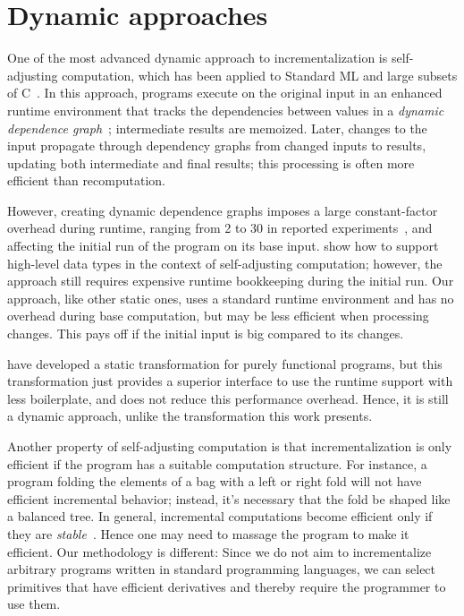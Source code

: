 \section{Dynamic approaches}
One of the most advanced dynamic approach to incrementalization is
self-adjusting computation, which has been applied to Standard ML
and large subsets of C~\citep{Acar09,Hammer11}.
In this approach, programs execute on the original
input in an enhanced runtime environment that tracks the
dependencies between values in a \emph{dynamic
  dependence graph}~\citep{Acar06}; intermediate results are
memoized.
Later, changes to the input propagate through
dependency graphs from changed inputs to results,
updating both intermediate and final results;
this processing is often more efficient than recomputation.

However, creating dynamic
dependence graphs imposes a large constant-factor overhead during
runtime, ranging from 2 to 30 in reported
experiments~\citep{Acar09EAS,Acar10TDT}, and affecting the
initial run of the program on its base input.
\citet{Acar10TDT} show how to support high-level data
types in the context of self-adjusting computation; however, the
approach still requires expensive runtime bookkeeping during the initial run.
Our approach, like other static ones, uses a standard runtime
environment and has no overhead
during base computation, but may be less efficient when processing
changes. This pays off if the initial input is
big compared to its changes.


\citet{Chen11} have developed a static transformation for purely
functional programs, but this transformation just provides a superior interface to use
the runtime support with less boilerplate, and does not reduce
this performance overhead. Hence, it is still a dynamic approach, unlike
the transformation this work presents.

Another property of self-adjusting computation
is that incrementalization is only efficient if the program has a suitable
computation structure. For instance, a program
folding the elements of a bag with a left or right fold will not
have efficient incremental behavior; instead, it's necessary that
the fold be shaped like a balanced tree. In general,
incremental computations become efficient only if they are \emph{stable}~\citep{Acar05}.
Hence one may need to massage the program to make it efficient. Our methodology is
different: Since we do not aim to incrementalize arbitrary programs written in standard
programming languages, we can select primitives that have efficient derivatives and thereby require
the programmer to use them.

